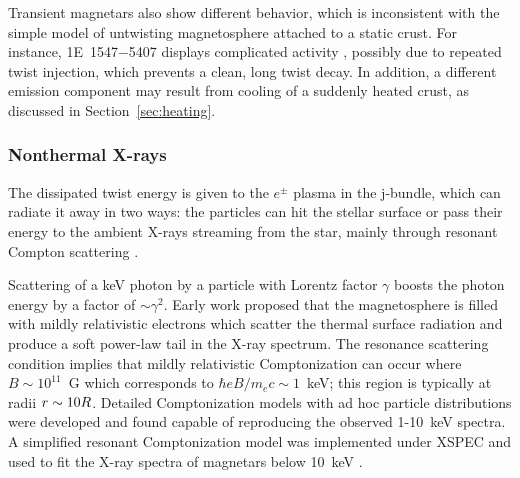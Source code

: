 Transient magnetars also show different behavior, which is inconsistent with 
the simple model of untwisting  magnetosphere attached to a static crust.
For instance, 1E~1547$-$5407 displays complicated activity \citep{khd+12},
possibly due to repeated twist injection, which prevents
a clean, long twist decay. In addition, a different emission component
may  result from cooling of a suddenly heated crust, as discussed in 
Section~\ref{sec:heating}.


\subsubsection{Nonthermal X-rays}
\label{sec:nonth}


The dissipated twist energy is given to the $e^\pm$ plasma in the j-bundle, 
which can radiate it away in two ways: the particles can hit the stellar surface or 
pass their energy to the ambient X-rays streaming from the star, mainly through  
resonant Compton scattering \citep{tlk02,bh07}. 

Scattering of a keV photon by a particle with Lorentz factor $\gamma$ 
boosts the photon energy by a factor of $\sim\gamma^2$. Early work \citep{tlk02}
proposed that the magnetosphere is filled with mildly relativistic electrons 
which scatter the thermal surface radiation and produce 
a soft power-law tail in the X-ray spectrum.
The resonance scattering condition implies that mildly relativistic Comptonization 
can occur where $B\sim 10^{11}$~G which corresponds to $\hbar eB/m_ec\sim 1$~keV;
this region is typically at radii $r\sim 10R$. Detailed Comptonization models 
with ad hoc particle distributions were developed 
\citep{lg06,ft07,ntz08}
and found capable of reproducing the observed 1-10~keV spectra.
A simplified resonant Comptonization model was implemented under XSPEC and 
used to fit the X-ray spectra of magnetars below 10~keV 
\citep{rzt+08,zrtn09}.

